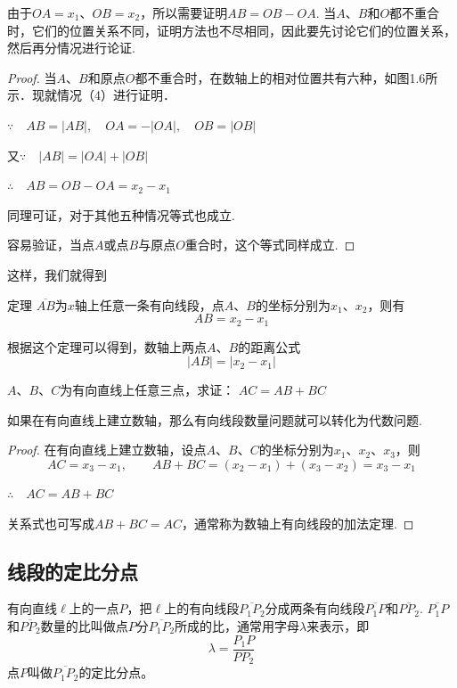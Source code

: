 \begin{analyze}
由于$OA=x_1$、$OB=x_2$，所以需要证明$AB=OB-OA$. 当$A$、$B$和$O$都不重合时，它们的位置关系不同，证明方法也不尽相同，因此要先讨论它们的位置关系，然后再分情况进行论证.
\end{analyze}

\begin{proof}
当$A$、$B$和原点$O$都不重合时，在数轴上的相对位置共有六种，如图1.6所示．现就情况（4）进行证明．

$\because\quad AB=|AB|,\quad OA=-|OA|,\quad OB=|OB|$

又$\because\quad |AB|=|OA|+|OB|$

$\therefore\quad AB=OB-OA=x_2-x_1$

同理可证，对于其他五种情况等式也成立.

容易验证，当点$A$或点$B$与原点$O$重合时，这个等式同样成立.
\end{proof}

这样，我们就得到
\begin{thm}
    {定理} $\overline{AB}$为$x$轴上任意一条有向线段，点$A$、$B$的坐标分别为$x_1$、$x_2$，则有
\[AB=x_2-x_1\]
\end{thm}

根据这个定理可以得到，数轴上两点$A$、$B$的距离公式
\[|AB|=|x_2-x_1|\]

\begin{example}
    $A$、$B$、$C$为有向直线上任意三点，求证：
$AC=AB+BC$
\end{example}

\begin{analyze}
 如果在有向直线上建立数轴，那么有向线段数量问题就可以转化为代数问题.
\end{analyze}

\begin{proof}
在有向直线上建立数轴，设点$A$、$B$、$C$的坐标分别为$x_1$、$x_2$、$x_3$，则
\[AC=x_3-x_1,\qquad AB+BC=(x_2-x_1)+(x_3-x_2)=x_3-x_1\] 

$\therefore\quad AC=AB+BC$

关系式也可写成$AB+BC=AC$，通常称为数轴上有向线段的加法定理.

\end{proof}

\subsection{线段的定比分点}
有向直线$\ell$上的一点$P$，把$\ell$上的有向线段$\overline{P_1P_2}$分成两条有向线段$\overline{P_1P}$和$\overline{PP_2}$. $\overline{P_1P}$和$\overline{PP_2}$数量的比叫做点$P$分$\overline{P_1P_2}$所成的比，通常用字母$\lambda$来表示，即
\[\lambda=\frac{P_1P}{PP_2}\]
点$P$叫做$\overline{P_1P_2}$的定比分点。

